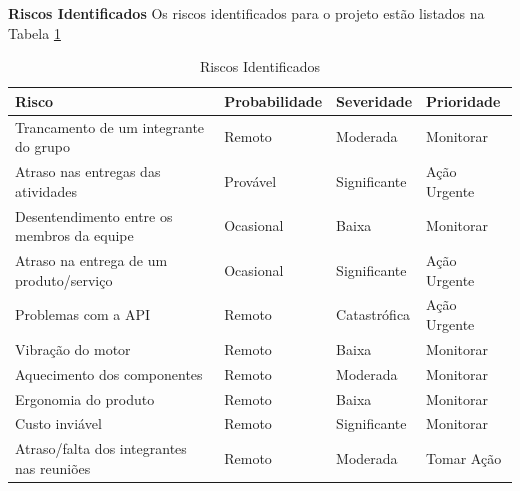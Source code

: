 		\textbf{Riscos Identificados}
		Os riscos identificados para o projeto estão listados na Tabela \ref{riscos_identificados}
		
		\begin{table}[h!]
			\centering
			\caption{Riscos Identificados}
			\label{riscos_identificados}
			\begin{tabular}{|llll|}
				\hline
				\multicolumn{1}{|l|}{\textbf{Risco}}       & \multicolumn{1}{l|}{\textbf{Probabilidade}} & \multicolumn{1}{l|}{\textbf{Severidade}} & \textbf{Prioridade} \\ \hline
				Trancamento de um integrante do grupo      & Remoto                                      & Moderada                                 & Monitorar           \\ \hline
				Atraso nas entregas das atividades         & Provável                                    & Significante                             & Ação Urgente        \\ \hline
				Desentendimento entre os membros da equipe & Ocasional                                   & Baixa                                    & Monitorar           \\ \hline
				Atraso na entrega de um produto/serviço    & Ocasional                                   & Significante                             & Ação Urgente        \\ \hline
				Problemas com a API                        & Remoto                                      & Catastrófica                             & Ação Urgente        \\ \hline
				Vibração do motor                          & Remoto                                      & Baixa                                    & Monitorar           \\ \hline
				Aquecimento dos componentes                & Remoto                                      & Moderada                                 & Monitorar           \\ \hline
				Ergonomia do produto                       & Remoto                                      & Baixa                                    & Monitorar           \\ \hline
				Custo inviável                             & Remoto                                      & Significante                             & Monitorar           \\ \hline
				Atraso/falta dos integrantes nas reuniões  & Remoto                                      & Moderada                                 & Tomar Ação          \\ \hline
			\end{tabular}
		\end{table}
		
